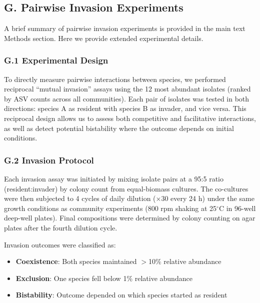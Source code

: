 \subsection*{G. Pairwise Invasion Experiments}
\label{sec:suppl:invasion}

A brief summary of pairwise invasion experiments is provided in the main text Methods section. Here we provide extended experimental details.

\subsubsection*{G.1 Experimental Design}

To directly measure pairwise interactions between species, we performed reciprocal ``mutual invasion'' assays using the 12 most abundant isolates (ranked by ASV counts across all communities). Each pair of isolates was tested in both directions: species A as resident with species B as invader, and vice versa. This reciprocal design allows us to assess both competitive and facilitative interactions, as well as detect potential bistability where the outcome depends on initial conditions.

\subsubsection*{G.2 Invasion Protocol}

Each invasion assay was initiated by mixing isolate pairs at a 95:5 ratio (resident:invader) by colony count from equal-biomass cultures. The co-cultures were then subjected to 4 cycles of daily dilution ($\times$30 every 24 h) under the same growth conditions as community experiments (800 rpm shaking at 25$^\circ$C in 96-well deep-well plates). Final compositions were determined by colony counting on agar plates after the fourth dilution cycle.

Invasion outcomes were classified as:
\begin{itemize}
    \item \textbf{Coexistence}: Both species maintained $>$10\% relative abundance
    \item \textbf{Exclusion}: One species fell below 1\% relative abundance
    \item \textbf{Bistability}: Outcome depended on which species started as resident
\end{itemize}

